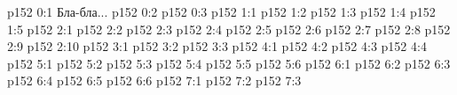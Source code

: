 \author{Промежуточные создания}
\vs p152 0:1  Бла-бла...
\vs p152 0:2 
\vs p152 0:3 
\vs p152 1:1 
\vs p152 1:2 
\vs p152 1:3 \pc 
\vs p152 1:4 \pc 
\vs p152 1:5 
\vs p152 2:1 
\vs p152 2:2 
\vs p152 2:3 
\vs p152 2:4 
\vs p152 2:5 \pc 
\vs p152 2:6 \pc 
\vs p152 2:7 
\vs p152 2:8 
\vs p152 2:9 
\vs p152 2:10 \pc 
{}
\vs p152 3:1 
\vs p152 3:2 
\vs p152 3:3 \pc 
{}
\vs p152 4:1 
\vs p152 4:2 
\vs p152 4:3 
\vs p152 4:4 
\vs p152 5:1 
\vs p152 5:2 \pc 
\vs p152 5:3 \pc 
\vs p152 5:4 
\vs p152 5:5 \pc 
\vs p152 5:6 
\vs p152 6:1 
\vs p152 6:2 
\vs p152 6:3 \pc 
\vs p152 6:4 \pc 
\vs p152 6:5 
\vs p152 6:6 \pc 
{}
\vs p152 7:1 
\vs p152 7:2 
\vs p152 7:3 
\quizlink
